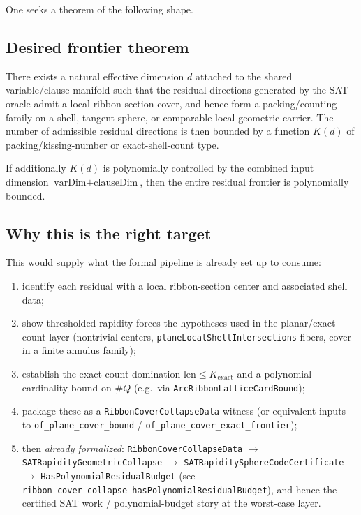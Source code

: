 \documentclass[11pt]{article}
\begin{document}
One seeks a theorem of the following shape.

\subsection*{Desired frontier theorem}

There exists a natural effective dimension \(d\) attached to the shared variable/clause
manifold such that the residual directions generated by the SAT oracle admit a local
ribbon-section cover, and hence form a packing/counting family on a shell, tangent sphere,
or comparable local geometric carrier. The number of admissible residual directions is then
bounded by a function \(K(d)\) of packing/kissing-number or exact-shell-count type.

If additionally \(K(d)\) is polynomially controlled by the combined input dimension
\(\text{varDim}+\text{clauseDim}\), then the entire residual frontier is polynomially bounded.

\subsection*{Why this is the right target}

This would supply what the formal pipeline is already set up to consume:

\begin{enumerate}[leftmargin=2em]
  \item identify each residual with a local ribbon-section center and associated shell data;
  \item show thresholded rapidity forces the hypotheses used in the planar/exact-count layer
  (nontrivial centers, \texttt{planeLocalShellIntersections} fibers, cover in a finite annulus family);
  \item establish the exact-count domination \(\mathrm{len} \le K_{\mathrm{exact}}\) and a polynomial
  cardinality bound on \(\#Q\) (e.g.\ via \texttt{ArcRibbonLatticeCardBound});
  \item package these as a \texttt{RibbonCoverCollapseData} witness (or equivalent inputs to
  \texttt{of\_plane\_cover\_bound} / \texttt{of\_plane\_cover\_exact\_frontier});
  \item then \emph{already formalized}: \texttt{RibbonCoverCollapseData} \(\to\)
  \texttt{SATRapidityGeometricCollapse} \(\to\) \texttt{SATRapiditySphereCodeCertificate} \(\to\)
  \texttt{HasPolynomialResidualBudget} (see \texttt{ribbon\_cover\_collapse\_hasPolynomialResidualBudget}),
  and hence the certified SAT work / polynomial-budget story at the worst-case layer.
\end{enumerate}
\end{document}
